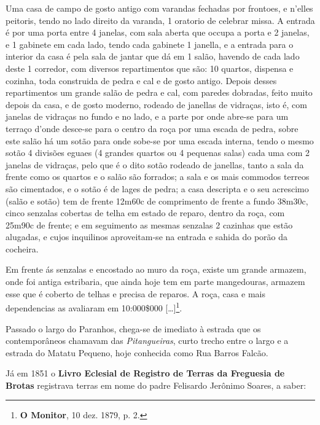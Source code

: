 \begin{citacao}
Uma casa de campo de gosto antigo com varandas fechadas por frontoes, e n'elles peitoris, tendo no lado direito da varanda, 1 oratorio de celebrar missa. A entrada é por uma porta entre 4 janelas, com sala aberta que occupa a porta e 2 janelas, e 1 gabinete em cada lado, tendo cada gabinete 1 janella, e a entrada para o interior da casa é pela sala de jantar que dá em 1 salão, havendo de cada lado deste 1 corredor, com diversos repartimentos que são: 10 quartos, dispensa e cozinha, toda construida de pedra e cal e de gosto antigo. Depois desses repartimentos um grande salão de pedra e cal, com paredes dobradas, feito muito depois da casa, e de gosto moderno, rodeado de janellas de vidraças, isto é, com janelas de vidraças no fundo e no lado, e a parte por onde abre-se para um terraço d'onde desce-se para o centro da roça por uma escada de pedra, sobre este salão há um sotão para onde sobe-se por uma escada interna, tendo o mesmo sotão 4 divisões eguaes (4 grandes quartos ou 4 pequenas salas) cada uma com 2 janelas de vidraças, pelo que é o dito sotão rodeado de janellas, tanto a sala da frente como os quartos e o salão são forrados; a sala e os mais commodos terreos são cimentados, e o sotão é de lages de pedra; a casa descripta e o seu acrescimo (salão e sotão) tem de frente 12m60c de comprimento de frente a fundo 38m30c, cinco senzalas cobertas de telha em estado de reparo, dentro da roça, com 25m90c de frente; e em seguimento as mesmas senzalas 2 cazinhas que estão alugadas, e cujos inquilinos aproveitam-se na entrada e sahida do porão da cocheira.

Em frente ás senzalas e encostado ao muro da roça, existe um grande armazem, onde foi antiga estribaria, que ainda hoje tem em parte mangedouras, armazem esse que é coberto de telhas e precisa de reparos. A roça, casa e mais dependencias as avaliaram em 10:000\$000 [\dots]\footnote{\textbf{O Monitor}, 10 dez. 1879, p. 2.}.
\end{citacao}

Passado o largo do Paranhos, chega-se de imediato à estrada que os contemporâneos chamavam das \textit{Pitangueiras}, curto trecho entre o largo e a estrada do Matatu Pequeno, hoje conhecida como Rua Barros Falcão. 

Já em 1851 o \textbf{Livro Eclesial de Registro de Terras da Freguesia de Brotas} registrava terras em nome do padre Felisardo Jerônimo Soares, a saber:

